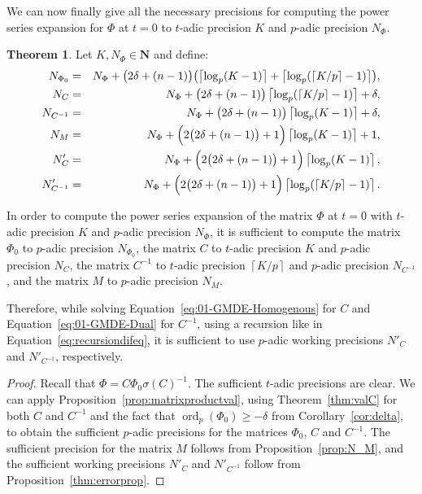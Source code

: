 \documentclass[a4paper,11pt]{article}
\numberwithin{equation}{section}
\providecommand{\ceil}[1]{\left\lceil#1\right\rceil}   %
\newcommand{\NN}{\mathbf{N}} %
\DeclareMathOperator{\ord}{ord}          %
\theoremstyle{definition}
\newtheorem{thm}{Theorem}[section]
\begin{document}
We can now finally give all the necessary precisions for computing the power 
series expansion for $\Phi$ at $t=0$ to $t$-adic precision $K$ and $p$-adic 
precision $N_{\Phi}$.

\begin{thm} \label{thm:Ni}
Let $K,N_{\Phi} \in \NN$ and define:
\begin{eqnarray*}
N_{\Phi_0}   		&=& N_{\Phi}+\bigl(2\delta+(n-1)\bigr) \bigl( \ceil{\log_p(K-1)} + \ceil{\log_p(\ceil{K/p}-1)}\bigr),\\
N_{C}				&=& N_{\Phi}+\bigl(2\delta+(n-1)\bigr) \ceil{ \log_p(\ceil{K/p}-1)} + \delta, \\
N_{C^{-1}}			&=& N_{\Phi}+\bigl(2\delta+(n-1)\bigr) \ceil{\log_p(K-1)} + \delta, \\
N_M                 &=& N_{\Phi}+\Bigl(2\bigl(2 \delta + (n-1)\bigr) + 1\Bigr) \ceil{\log_p(K-1)}+1, \\
N'_C			    &=& N_{\Phi}+\Bigl(2 \bigl(2 \delta + (n-1)\bigr) + 1\Bigr) \ceil{\log_p(K-1)}, \\
N'_{C^{-1}}	        &=& N_{\Phi}+\Bigl(2 \bigl(2 \delta + (n-1)\bigr) + 1\Bigr) \ceil{\log_p(\ceil{K/p}-1)}.
\end{eqnarray*}

In order to compute the power series expansion 
of the matrix $\Phi$ at $t=0$ with $t$-adic precision $K$ and $p$-adic precision $N_{\Phi}$,
it is sufficient to compute
the matrix $\Phi_0$ to $p$-adic precision $N_{\Phi_0}$,
the matrix $C$ to $t$-adic precision $K$ and $p$-adic precision $N_{C}$, 
the matrix $C^{-1}$ to $t$-adic precision $\ceil{K/p}$ and $p$-adic precision 
$N_{C^{-1}}$, and 
the matrix $M$ to $p$-adic precision $N_M$.

Therefore, while solving Equation~\eqref{eq:01-GMDE-Homogenous} for $C$ and 
Equation~\eqref{eq:01-GMDE-Dual} for $C^{-1}$, using a recursion like in 
Equation~\eqref{eq:recursiondifeq}, it is sufficient to use $p$-adic 
working precisions $N'_C$ and $N'_{C^{-1}}$, respectively.
\end{thm}

\begin{proof}
Recall that $\Phi = C \Phi_0 \sigma(C)^{-1}$. The sufficient $t$-adic 
precisions are clear. We can apply Proposition~\ref{prop:matrixproductval}, 
using Theorem~\ref{thm:valC} for both $C$ and $C^{-1}$ and the fact that 
$\ord_p(\Phi_0) \geq -\delta$ from Corollary~\ref{cor:delta}, to obtain 
the sufficient $p$-adic precisions for the matrices $\Phi_0$, $C$ and $C^{-1}$. 
The sufficient precision for the matrix $M$ follows from Proposition~\ref{prop:N_M},
and the sufficient working precisions $N'_C$ and $N'_{C^{-1}}$
follow from Proposition~\ref{thm:errorprop}.
\end{proof}
\end{document}

